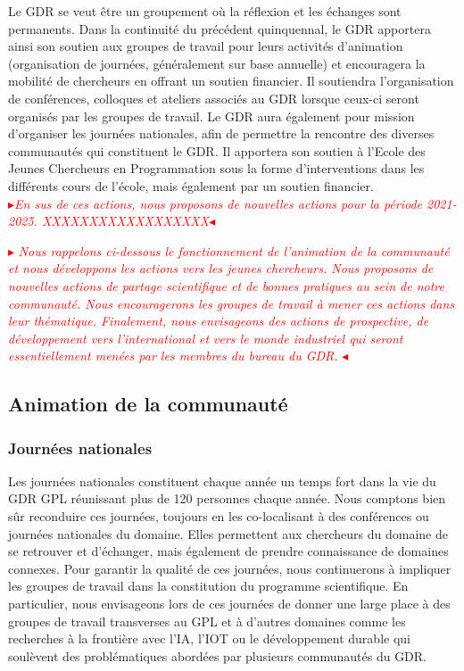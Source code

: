\documentclass[11pt]{article}
\newcommand{\mynote}[3][black]{\textcolor{#1}{\fbox{\bfseries\sffamily\scriptsize{#2}}
{\small$\blacktriangleright$\textsf{\emph{#3}}$\blacktriangleleft$}}}
\newcommand{\pem}[1]{} %
\newcommand{\TODO}[1]{\mynote[red]{TODO}{#1}}
\begin{document}
Le GDR se veut être un groupement\pem{est-ce le bon terme ?} où la réflexion et les échanges sont permanents.
Dans la continuité du précédent quinquennal, le GDR apportera ainsi son soutien aux groupes de travail pour leurs activités d'animation (organisation de journées, généralement sur base annuelle) et encouragera la mobilité de chercheurs en offrant un soutien financier. Il soutiendra l'organisation de conférences, colloques et ateliers associés au GDR lorsque ceux-ci seront organisés par les groupes de travail.
Le GDR aura également pour mission d'organiser les journées nationales, afin de permettre la rencontre des diverses communautés qui constituent le GDR. Il apportera son soutien à l'Ecole des Jeunes Chercheurs en Programmation sous la forme d'interventions dans les différents cours de l'école, mais également par un soutien financier. \\
\TODO{En sus de ces actions, nous proposons de nouvelles actions pour la période 2021-2025. 
XXXXXXXXXXXXXXXXXX}

\TODO{
Nous rappelons ci-dessous le fonctionnement de l'animation de la communauté et nous développons les actions vers les jeunes chercheurs. Nous proposons de nouvelles actions de partage scientifique et de bonnes pratiques au sein de notre communauté. Nous encouragerons les groupes de travail à mener ces actions dans leur thématique.
Finalement, nous envisageons des actions de prospective, de développement vers l'international et vers le monde industriel qui seront essentiellement menées par les membres du bureau du GDR.
}


\subsection{Animation de la communauté}

\subsubsection{Journées nationales}

Les journées nationales constituent chaque année un temps fort dans la vie du
GDR GPL réunissant plus de 120 personnes chaque année. Nous comptons bien sûr reconduire ces journées, toujours en les co-localisant à des conférences ou journées nationales du domaine.
Elles permettent aux chercheurs du domaine de se retrouver et d'échanger, mais
également de prendre connaissance de domaines connexes. 
Pour garantir la qualité de ces journées, nous continuerons à impliquer les groupes de travail dans la constitution du programme scientifique. En particulier, nous envisageons lors de ces journées de donner une large place à des groupes de travail transverses au GPL et à d'autres domaines comme les recherches à la frontière avec l'IA, l'IOT ou le développement durable qui soulèvent des problématiques abordées par plusieurs communautés du GDR. 
\end{document}

